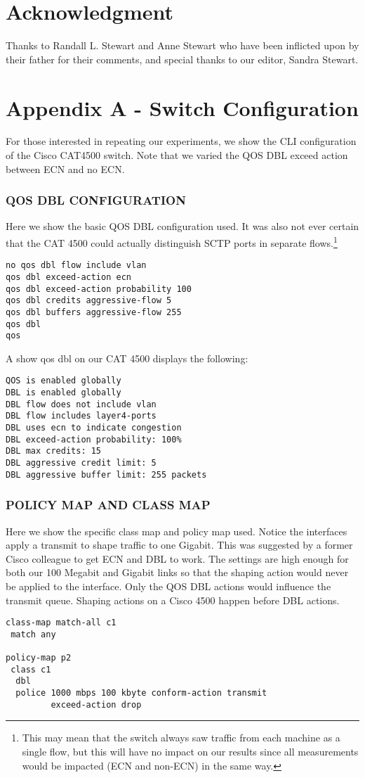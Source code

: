 \documentclass[12pt]{article}
\begin{document}
\section*{Acknowledgment}

Thanks to  Randall L. Stewart and Anne Stewart who have been inflicted upon by their father for their comments, and special thanks to our editor,  Sandra Stewart.

\section*{Appendix A - Switch Configuration}

For those interested in repeating our experiments, we show the CLI configuration of the Cisco CAT4500 switch.
Note that we varied the QOS DBL exceed action between ECN and no ECN.

\subsubsection{QOS DBL CONFIGURATION}
 
Here we show the basic QOS DBL configuration used. It was
also not ever certain that the CAT 4500 could actually distinguish SCTP ports in separate flows.\footnote{This
may mean that the switch always saw traffic from each machine as a single flow, but this will have no impact on
our results since all measurements would be impacted (ECN and non-ECN) in the same way.}
\begin{verbatim}
no qos dbl flow include vlan
qos dbl exceed-action ecn
qos dbl exceed-action probability 100
qos dbl credits aggressive-flow 5
qos dbl buffers aggressive-flow 255
qos dbl   
qos
\end{verbatim}
A show qos dbl on our CAT 4500 displays the following:
\begin{verbatim}
QOS is enabled globally
DBL is enabled globally
DBL flow does not include vlan
DBL flow includes layer4-ports
DBL uses ecn to indicate congestion
DBL exceed-action probability: 100%
DBL max credits: 15
DBL aggressive credit limit: 5
DBL aggressive buffer limit: 255 packets
\end{verbatim}

\subsubsection {POLICY MAP AND CLASS MAP}

Here we show the specific class map and policy map used. Notice
the interfaces apply a  transmit to shape traffic to one Gigabit. This was suggested
by a former Cisco colleague to get ECN and DBL to work. The settings
are high enough for both our 100 Megabit and Gigabit links so that 
the shaping action would never be applied to the interface. Only the
QOS DBL actions would influence the transmit queue. Shaping actions
on a Cisco 4500 happen before DBL actions.
\begin{verbatim}
class-map match-all c1
 match any 

policy-map p2
 class c1 
  dbl  
  police 1000 mbps 100 kbyte conform-action transmit
         exceed-action drop 
\end{verbatim}
\end{document}
